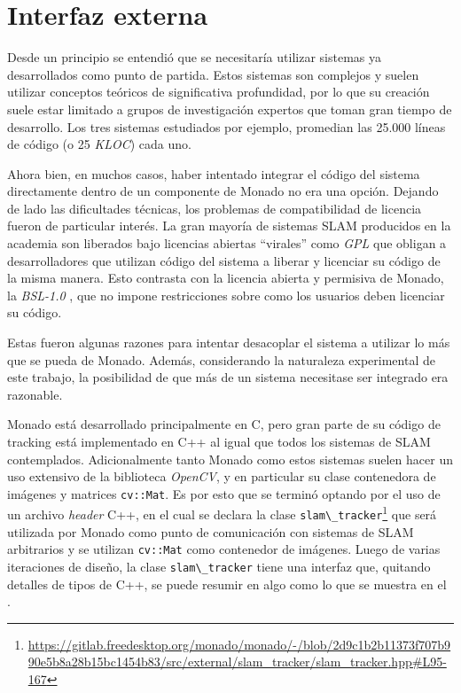 \documentclass[ twoside,openright,titlepage,numbers=noenddot,%
                headinclude,footinclude,cleardoublepage=empty,abstract=on,
                BCOR=-5mm,paper=a4,fontsize=11pt
                ]{scrreprt}
\newcommand{\passthrough}[1]{#1}
\begin{document}
\FloatBarrier

\hypertarget{interfaz-externa}{%
\section{Interfaz externa}\label{interfaz-externa}}

Desde un principio se entendió que se necesitaría utilizar sistemas ya
desarrollados como punto de partida. Estos sistemas son complejos y
suelen utilizar conceptos teóricos de significativa profundidad, por lo
que su creación suele estar limitado a grupos de investigación expertos
que toman gran tiempo de desarrollo. Los tres sistemas estudiados por
ejemplo, promedian las 25.000 líneas de código (o 25 \emph{KLOC}) cada
uno.

Ahora bien, en muchos casos, haber intentado integrar el código del
sistema directamente dentro de un componente de Monado no era una
opción. Dejando de lado las dificultades técnicas, los problemas de
compatibilidad de licencia fueron de particular interés. La gran mayoría
de sistemas SLAM producidos en la academia son liberados bajo licencias
abiertas ``virales'' como \emph{GPL} \autocite{GNUGeneralPublic} que
obligan a desarrolladores que utilizan código del sistema a liberar y
licenciar su código de la misma manera. Esto contrasta con la licencia
abierta y permisiva de Monado, la \emph{BSL-1.0}
\autocite{BoostSoftwareLicensea}, que no impone restricciones sobre como
los usuarios deben licenciar su código.

Estas fueron algunas razones para intentar desacoplar el sistema a
utilizar lo más que se pueda de Monado. Además, considerando la
naturaleza experimental de este trabajo, la posibilidad de que más de un
sistema necesitase ser integrado era razonable.

Monado está desarrollado principalmente en C, pero gran parte de su
código de tracking está implementado en C++ al igual que todos los
sistemas de SLAM contemplados. Adicionalmente tanto Monado como estos
sistemas suelen hacer un uso extensivo de la biblioteca \emph{OpenCV}, y
en particular su clase contenedora de imágenes y matrices
\passthrough{\lstinline!cv::Mat!}. Es por esto que se terminó optando
por el uso de un archivo \emph{header} C++, en el cual se declara la
clase \passthrough{\lstinline!slam\_tracker!}\footnote{\url{https://gitlab.freedesktop.org/monado/monado/-/blob/2d9c1b2b11373f707b990e5b8a28b15bc1454b83/src/external/slam_tracker/slam_tracker.hpp\#L95-167}}
que será utilizada por Monado como punto de comunicación con sistemas de
SLAM arbitrarios y se utilizan \passthrough{\lstinline!cv::Mat!} como
contenedor de imágenes. Luego de varias iteraciones de diseño, la clase
\passthrough{\lstinline!slam\_tracker!} tiene una interfaz que, quitando
detalles de tipos de C++, se puede resumir en algo como lo que se
muestra en el .
\end{document}
